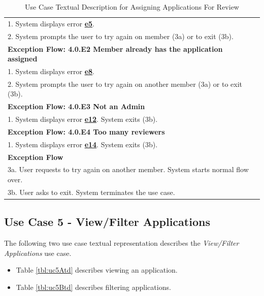 \documentclass[fontsize=12pt,paper=letter,twoside]{scrartcl}
\begin{document}
\begin{table}[!htb]
\begin{center}
\begin{tabular}{|l|l|}
\\ 1. System displays error \hyperref[app:error]{\textbf{e5}}.
\\ 2. System prompts the user to try again on member (3a) or to exit (3b).
\\ \hline
\textbf{Exception Flow: 4.0.E2 Member already has the application assigned}
\\ 1. System displays error \hyperref[app:error]{\textbf{e8}}.
\\ 2. System prompts the user to try again on another member (3a) or to exit (3b).
\\ \hline
\textbf{Exception Flow: 4.0.E3 Not an Admin}
\\ 1. System displays error  \hyperref[app:error]{\textbf{e12}}.  System exits (3b).\\ \hline 
\textbf{Exception Flow: 4.0.E4 Too many reviewers}
\\ 1. System displays error  \hyperref[app:error]{\textbf{e14}}. System exits (3b).\\ \hline 
\textbf{Exception Flow}
\\ 3a. User requests to try again on another member. System starts normal flow over.
\\ 3b. User asks to exit. System terminates the use case.\\ \hline
\end{tabular}
\end{center}
\caption {Use Case Textual Description for Assigning Applications For Review}
\label{tbl:uc4td}
\end{table}

\clearpage
\newpage
\subsection{Use Case 5 - View/Filter Applications} \label{subsec:uc5}

The following two use case textual representation describes the \emph{View/Filter Applications} use case.

\begin{itemize}
\item Table \ref{tbl:uc5Atd} describes viewing an application.
\item Table \ref{tbl:uc5Btd} describes filtering applications.
\end{itemize} 
\end{document}
